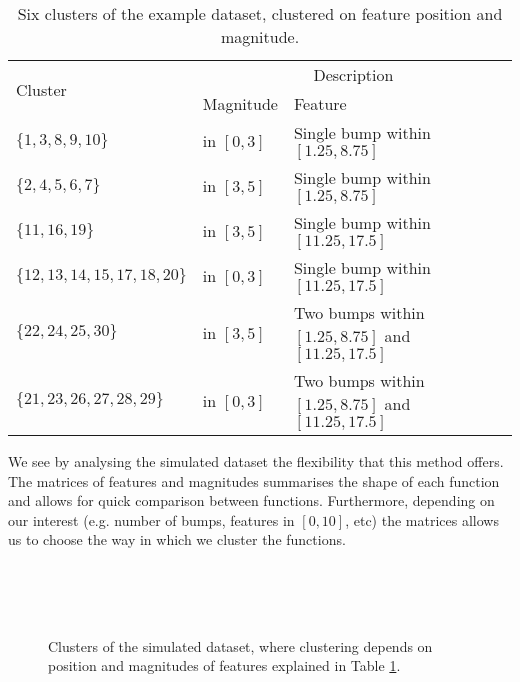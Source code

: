 \documentclass[12pt]{book} %
\begin{document}
 \begin{table}[h!]
  \begin{center}
    \begin{tabular}{|l|l|p{6.7cm}|}
    \hline
     \multirow{2}{4em}{Cluster} & \multicolumn{2}{c|}{Description} \\
     & Magnitude & Feature \\ \hline 
      $\{1,3,8,9,10\}$ & in $[0,3]$& Single bump within $[1.25,8.75]$ \\
      $\{2,4,5,6,7\}$ & in $[3,5]$ & Single bump within $[1.25,8.75]$\\
      $\{11,16,19\}$ &in $[3,5]$ & Single bump within $[11.25,17.5]$ \\
      $\{12,13,14,15,17,18,20\}$ &in $[0,3]$& Single bump within $[11.25,17.5]$ \\
      $\{22,24,25,30\}$ &in $[3,5]$ & Two bumps within $[1.25,8.75]$ and $[11.25,17.5]$ \\
      $\{21,23,26,27,28,29\}$&in $[0,3]$ & Two bumps within $[1.25,8.75]$ and $[11.25,17.5]$ \\ 
      \hline
       \end{tabular}
  \end{center}
     \caption{Six clusters of the example dataset, clustered on feature position and magnitude.}
      \label{table:ExCluster2}
\end{table} 

We see by analysing the simulated dataset the flexibility that this method offers. The matrices of features and magnitudes summarises the shape of each function and allows for quick comparison between functions. Furthermore, depending on our interest (e.g. number of bumps, features in $[0,10]$, etc) the matrices allows us to choose the way in which we cluster the functions.  


  \begin{figure}[ht!]
   \hrulefill
   \begin{center} 
     \quad
      \\ 
      
          \quad
      \\
       
          \quad
       \\
    \end{center}     
    \caption{Clusters of the simulated dataset, where clustering depends on position and magnitudes of features explained in Table \ref{table:ExCluster2}. }
    \label{fig:Plot_ExCluster}
    \hrulefill
    \end{figure}
\end{document}
